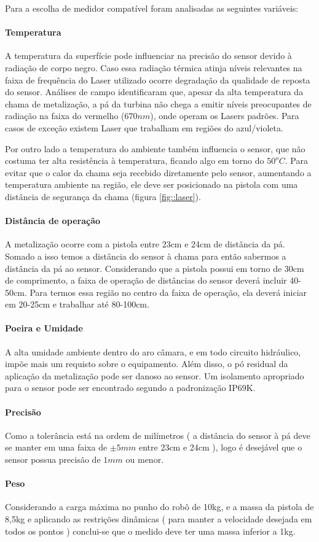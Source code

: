 Para a escolha de medidor compatível foram analisadas as seguintes variáveis:

\paragraph{Temperatura}
A temperatura da superfície pode influenciar na precisão do sensor devido à
radiação de corpo negro. Caso essa radiação térmica atinja níveis relevantes na
faixa de frequência do Laser utilizado ocorre degradação da qualidade de
reposta do sensor. Análises de campo identificaram que, apesar da alta
temperatura da chama de metalização, a pá da turbina não chega a emitir níveis
preocupantes de radiação na faixa do vermelho ($670 nm$), onde operam os Lasers
padrões. Para casos de exceção existem Laser que trabalham em regiões do
azul/violeta.

Por outro lado a temperatura do ambiente também influencia o sensor, que não
costuma ter alta resistência à temperatura, ficando algo em torno do $50^oC$.
Para evitar que o calor da chama seja recebido diretamente pelo sensor,
aumentando a temperatura ambiente na região, ele deve ser posicionado na pistola
com uma distância de segurança da chama (figura \ref{fig::laser}).

\paragraph{Distância de operação}
A metalização ocorre com a pistola entre 23cm e 24cm de distância da pá. Somado
a isso temos a distância do sensor à chama para então sabermos a distância da
pá ao sensor. Considerando que a pistola possui em torno de 30cm de comprimento,
a faixa de operação de distâncias do sensor deverá incluir 40-50cm. Para termos
essa região no centro da faixa de operação, ela deverá iniciar em 20-25cm e
trabalhar até 80-100cm.

\paragraph{Poeira e Umidade}
A alta umidade ambiente dentro do aro câmara, e em todo circuito hidráulico,
impõe mais um requisto sobre o equipamento. Além disso, o pó residual da
aplicação da metalização pode ser danoso ao sensor. Um isolamento apropriado
para o sensor pode ser encontrado segundo a padronização IP69K.

\paragraph{Precisão}
Como a tolerância está na ordem de milímetros ( a distância do sensor à pá deve
se manter em uma faixa de $\pm 5mm $ entre 23cm e 24cm ), logo é desejável que o
sensor possua precisão de $1mm$ ou menor.

\paragraph{Peso}
Considerando a carga máxima no punho do robô de 10kg, e a massa da pistola de
8,5kg e aplicando as restrições dinâmicas ( para manter a velocidade
desejada em todos os pontos ) conclui-se que o medido deve ter uma massa
inferior a 1kg.


